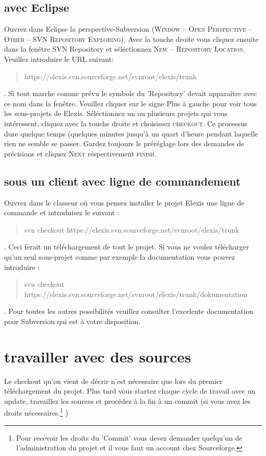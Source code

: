 \subsection{avec Eclipse}
Ouvrez dans Eclipse la perspective-Subversion (\textsc{Window -- Open
Perspective -- Other -- SVN Repository Exploring}). Avec la touche droite vous cliquez ensuite dans la fenêtre \glqq SVN Repository\grqq{} et séléctionnez \textsc{New --
Repository Location}. Veuillez introduire le URL suivant:
\begin{quote}https://elexis.svn.sourceforge.net/svnroot/elexis/trunk\end{quote}. Si tout marche comme prévu le symbole du 'Repository' devait apparaître avec ce nom dans la fenêtre. Veuillez cliquer sur le signe Plus à gauche pour voir tous les sous-projets de Elexis. Séléctionnez un ou plusieurs projets qui vous intéressent, cliquez avec la touche droite et choisissez \textsc{checkout}. Ce processus dure quelque temps (quelques minutes jusqu'à un quart d'heure pendant laquelle \glqq rien\grqq{} ne semble se passer. Gardez toujours le préréglage lors des demandes de précisions et cliquez \textsc{Next} réspectivement \textsc{finish}.
\subsection{sous un client avec ligne de commandement}
Ouvrez dans le classeur où vous pensez installer le projet Elexis une ligne de commande et introduisez le suivant : \begin{quote}svn checkout https://elexis.svn.sourceforge.net/svnroot/elexis/trunk\end{quote}. Ceci ferait un téléchargement de tout le projet. Si vous ne voulez télécharger qu'un seul sous-projet comme par exemple la documentation vous pouvez introduire : \begin{quote}svn checkout https://elexis.svn.sourceforge.net/svnroot/elexis/trunk/dokumentation\end{quote}. Pour toutes les autres possibilités veuillez consulter l'excelente documentation pour Subversion qui est à votre disposition.

\section{travailler avec des sources}
Le \glqq checkout\grqq{} qu'on vient de décrir n'est nécessaire que lors du premier téléchargement du projet. Plus tard vous startez chaque cycle de travail avec un \glqq update\grqq, travaillez les sources et procédez à la fin à un \glqq commit\grqq{} (si vous avez les droits nécessaires.\footnote{Pour recevoir les droits du 'Commit' vous devez demander quelqu'un de l'administration du projet et il vous faut un account chez Sourceforge. } )
